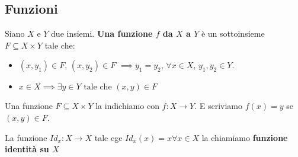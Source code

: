 \documentclass[a4paper,12pt]{article}
\begin{document}
\subsection{Funzioni}
Siano \(X\) e \(Y\) due insiemi. \textbf{Una funzione \(f\) da \(X\) a \(Y\)} è un sottoinsieme \(F \subseteq X \times Y\) tale che:
\begin{itemize}
    \item \((x, y_1) \in F\), \((x,y_2) \in F\) \(\implies y_1 = y_2\), \(\forall x \in X\), \(y_1,y_2 \in Y\).
    \item \(x \in X \implies \exists y \in Y \text{ tale che } (x,y) \in F\)
\end{itemize}
Una funzione \(F \subseteq X \times Y\) la indichiamo con \(f : X \to Y\). E scriviamo \(f(x) = y\) se \((x,y) \in F\).


La funzione \(Id_x : X \rightarrow X \) tale cge \(Id_x (x) = x \forall x \in X\) la chiamiamo \textbf{funzione identità su \(X\)}
\end{document}
